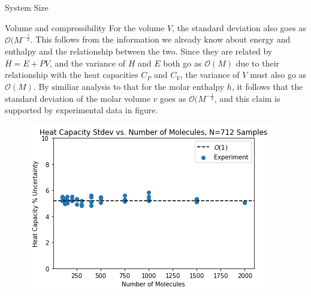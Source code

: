\documentclass[aps,pre,twocolumn,nofootinbib,superscriptaddress,linenumbers,10pt, draft,tightenlines]{revtex4-1}
\begin{document}
\begin{subsection}{System Size}
\begin{subsubsection}{Volume and compressibility}
For the volume $V$, the standard deviation also goes as $\mathcal{O}(M^{-\frac{1}{2}}$.  This follows from the information we already know about energy and enthalpy and the relationship between the two.  Since they are related by $H=E+PV$, and the variance of $H$ and $E$ both go as $\mathcal{O}(M)$ due to their relationship with the heat capacities $C_P$ and $C_V$, the variance of $V$ must also go as $\mathcal{O}(M)$.  By similiar analysis to that for the molar enthalpy $h$, it follows that the standard deviation of the molar volume $v$ goes as $\mathcal{O}(M^{-\frac{1}{2}}$, and this claim is supported by experimental data in figure. %
\begin{figure}[H]
\includegraphics[width=\textwidth]{../figures/heat_capacity_stdev_vs_M.png}
\end{figure}


\end{subsubsection}
\end{subsection}
\end{document}
